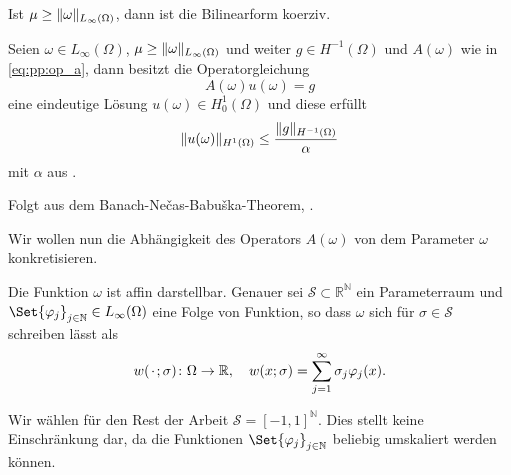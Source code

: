 \begin{Korollar}
    Ist $\mu \geq \lVert\omega\rVert_{L_{\infty}(\Omega)}$, dann ist die Bilinearform koerziv.
\end{Korollar}

\begin{Satz}
\label{satz:pp:lax_auf_elliptisch}
    Seien $\omega \in L_{\infty}(\Omega)$, $\mu \geq \lVert\omega\rVert_{L_{\infty}(\Omega)}$ und weiter $g \in H^{-1}(\Omega)$ und $A(\omega)$ wie in \eqref{eq:pp:op_a}, dann besitzt die Operatorgleichung
    \begin{equation}
        A(\omega) u(\omega) = g
    \end{equation}
    eine eindeutige Lösung $u(\omega) \in H^{1}_{0}(\Omega)$ und diese erfüllt
    \begin{equation}
        \lVert u(\omega)\rVert_{H^{1}(\Omega)} \leq \frac{\lVert g\rVert_{H^{-1}(\Omega)}}{\alpha}
    \end{equation}
    mit $\alpha$ aus .

    \begin{Beweis}
        Folgt aus dem Banach-Ne\v{c}as-Babu\v{s}ka-Theorem, .
    \end{Beweis}
\end{Satz}


Wir wollen nun die Abhängigkeit des Operators $A(\omega)$ von dem Parameter $\omega$ konkretisieren.

\begin{Definition}
\label{definition:pp:omega_affin}
    Die Funktion $\omega$ ist affin darstellbar.
    Genauer sei $\mathcal S \subset \mathbb{R}^{\mathbb{N}}$ ein Parameterraum und $\Set{ \varphi_{j} }_{j \in \mathbb{N}} \in L_{\infty}(\Omega)$ eine Folge von Funktion, so dass $\omega$ sich für $\sigma \in \mathcal S$ schreiben lässt als
    \begin{equation}
        w({\mkern2mu\cdot\mkern2mu}; \sigma) \colon \Omega \to \mathbb{R}, \quad w(x; \sigma) = \sum_{j = 1}^{\infty} \sigma_{j} \varphi_{j}(x).
    \end{equation}
\end{Definition}

\begin{Bemerkung}
    Wir wählen für den Rest der Arbeit $\mathcal S = [-1, 1]^{\mathbb{N}}$.
    Dies stellt keine Einschränkung dar, da die Funktionen $\Set{ \varphi_{j} }_{j \in \mathbb{N}}$ beliebig umskaliert werden können.
\end{Bemerkung}

